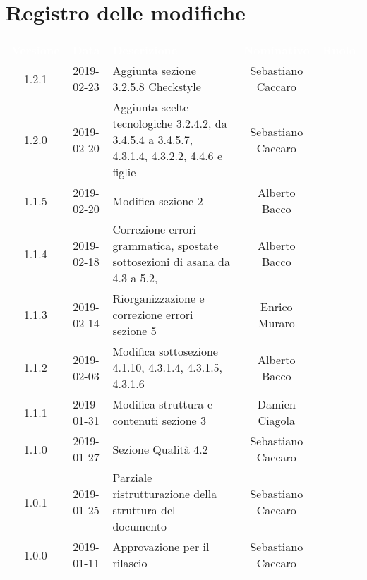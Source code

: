 
\section*{Registro delle modifiche}
{
	\renewcommand{\arraystretch}{1.5}
	\centering
	\begin{longtable}{ c c C{4cm}  c  c }
		
		\textcolor{white}{\textbf{Versione}} & \textcolor{white}{\textbf{Data}} & \textcolor{white}{\textbf{Descrizione}} & \textcolor{white}{\textbf{Nominativo}} & \textcolor{white}{\textbf{Ruolo}}\\
		1.2.1 & 2019-02-23 & Aggiunta sezione 3.2.5.8 Checkstyle & Sebastiano Caccaro & \reda{} \\		
		
		1.2.0 & 2019-02-20 & Aggiunta scelte tecnologiche 3.2.4.2, da 3.4.5.4 a 3.4.5.7, 4.3.1.4, 4.3.2.2, 4.4.6 e figlie & Sebastiano Caccaro & \reda{} \\		
		
		1.1.5 & 2019-02-20 & Modifica sezione 2 & Alberto Bacco & \reda{} \\
		
		1.1.4 & 2019-02-18 & Correzione errori grammatica, spostate sottosezioni di asana da 4.3 a 5.2, & Alberto Bacco & \reda{} \\
		
		1.1.3 & 2019-02-14 & Riorganizzazione e correzione errori sezione 5 & Enrico Muraro & \reda{} \\
		
		1.1.2 & 2019-02-03 & Modifica sottosezione 4.1.10, 4.3.1.4, 4.3.1.5, 4.3.1.6 & Alberto Bacco& \reda{} \\	
		
		1.1.1 & 2019-01-31 & Modifica struttura e contenuti sezione 3  & Damien Ciagola & \reda{} \\	
		
		1.1.0 & 2019-01-27 & Sezione Qualità 4.2 & Sebastiano Caccaro & \reda{} \\	
		
		1.0.1 & 2019-01-25 & Parziale ristrutturazione della struttura del documento & Sebastiano Caccaro & \reda{} \\		
		
		1.0.0 & 2019-01-11 & Approvazione per il rilascio & Sebastiano Caccaro & \Res{} \\
		

\end{longtable}}
